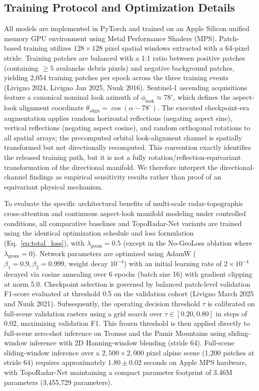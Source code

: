 \subsection{Training Protocol and Optimization Details}
\label{sec:method:training}

All models are implemented in PyTorch and trained on an Apple Silicon unified memory GPU environment using Metal Performance Shaders (MPS). Patch-based training utilizes $128 \times 128$ pixel spatial windows extracted with a 64-pixel stride. Training patches are balanced with a 1:1 ratio between positive patches (containing $\ge 5$ avalanche debris pixels) and negative background patches, yielding 2,054 training patches per epoch across the three training events (Livigno 2024, Livigno Jan 2025, Nuuk 2016). Sentinel-1 ascending acquisitions feature a canonical nominal look azimuth of $\phi_{\text{look}} \approx 78^\circ$, which defines the aspect-look alignment coordinate $\theta_{\text{align}} = \cos(\alpha - 78^\circ)$. The executed checkpoint-era augmentation applies random horizontal reflections (negating aspect sine), vertical reflections (negating aspect cosine), and random orthogonal rotations to all spatial arrays; the precomputed orbital look-alignment channel is spatially transformed but not directionally recomputed. This convention exactly identifies the released training path, but it is not a fully rotation/reflection-equivariant transformation of the directional manifold. We therefore interpret the directional-channel findings as empirical sensitivity results rather than proof of an equivariant physical mechanism.

To evaluate the specific architectural benefits of multi-scale radar-topographic cross-attention and continuous aspect-look manifold modeling under controlled conditions, all comparative baselines and TopoRadar-Net variants are trained using the identical optimization schedule and loss formulation (Eq.~\ref{eq:total_loss}), with $\lambda_{\text{geom}} = 0.5$ (except in the No-GeoLoss ablation where $\lambda_{\text{geom}} = 0$). Network parameters are optimized using AdamW ($\beta_1 = 0.9, \beta_2 = 0.999$, weight decay $10^{-4}$) with an initial learning rate of $2 \times 10^{-4}$ decayed via cosine annealing over 6 epochs (batch size 16) with gradient clipping at norm 5.0. Checkpoint selection is governed by balanced patch-level validation F1-score evaluated at threshold 0.5 on the validation cohort (Livigno March 2025 and Nuuk 2021). Subsequently, the operating decision threshold $\tau$ is calibrated on full-scene validation rasters using a grid search over $\tau \in [0.20, 0.80]$ in steps of 0.02, maximizing validation F1. This frozen threshold is then applied directly to full-scene zero-shot inference on Troms{\o} and the Pamir Mountains using sliding-window inference with 2D Hanning-window blending (stride 64). Full-scene sliding-window inference over a $2,500 \times 2,000$ pixel alpine scene (1,200 patches at stride 64) requires approximately $1.80 \pm 0.02$ seconds on Apple MPS hardware, with TopoRadar-Net maintaining a compact parameter footprint of 3.46M parameters (3,455,729 parameters).

